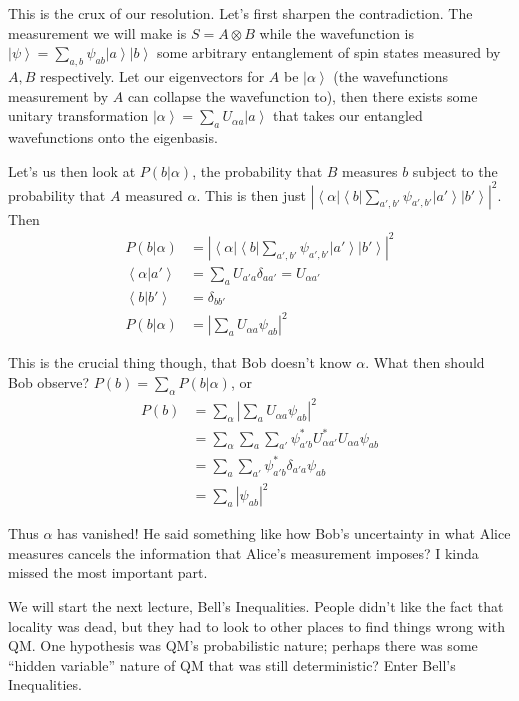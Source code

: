 \documentclass[10pt]{report}
\newcommand{\bra}[1]{\left<#1\right|}
\newcommand{\ket}[1]{\left|#1\right>}
\newcommand{\dotp}[2]{\left<#1\left.\right|#2\right>}
\newcommand{\abs}[1]{\left|#1\right|}
\begin{document}
This is the crux of our resolution. Let's first sharpen the contradiction. The measurement we will make is $S = A \otimes B$ while the wavefunction is $\ket{\psi} = \sum_{a,b}^{}\psi_{ab}\ket{a}\ket{b}$ some arbitrary entanglement of spin states measured by $A,B$ respectively. Let our eigenvectors for $A$ be $\ket{\alpha}$ (the wavefunctions measurement by $A$ can collapse the wavefunction to), then there exists some unitary transformation $\ket{\alpha} = \sum_a^{}U_{\alpha a}\ket{a}$ that takes our entangled wavefunctions onto the eigenbasis.

Let's us then look at $P(b|\alpha)$, the probability that $B$ measures $b$ subject to the probability that $A$ measured $\alpha$. This is then just $\abs{\bra{\alpha}\bra{b}\sum_{a',b'}^{}\psi_{a',b'}\ket{a'}\ket{b'}}^2$. Then
\begin{align}
    P(b|\alpha) &= \abs{\bra{\alpha}\bra{b}\sum_{a',b'}^{}\psi_{a',b'}\ket{a'}\ket{b'}}^2\\
    \dotp{\alpha}{a'} &= \sum_{a}^{}U_{a'a}\delta_{aa'} = U_{\alpha a'}\\
    \dotp{b}{b'} &= \delta_{b b'}\\
    P(b|\alpha) &= \abs{\sum_{a}^{}U_{\alpha a}\psi_{ab}}^2
\end{align}

This is the crucial thing though, that Bob doesn't know $\alpha$. What then should Bob observe? $P(b) = \sum_{\alpha}^{}P(b|\alpha)$, or
\begin{align}
    P(b) &= \sum_{\alpha}^{}\abs{\sum_{a}^{}U_{\alpha a}\psi_{ab}}^2\\
    &= \sum_{\alpha}^{}\sum_{a}^{}\sum_{a'}^{}\psi_{a' b}^*U_{\alpha a'}^*U_{\alpha a}\psi_{ab}\\
    &= \sum_{a}^{}\sum_{a'}^{}\psi_{a' b}^*\delta_{a' a}\psi_{ab}\\
    &= \sum_{a}^{}\abs{\psi_{ab}}^2
\end{align}

Thus $\alpha$ has vanished! He said something like how Bob's uncertainty in what Alice measures cancels the information that Alice's measurement imposes? I kinda missed the most important part.

We will start the next lecture, Bell's Inequalities. People didn't like the fact that locality was dead, but they had to look to other places to find things wrong with QM. One hypothesis was QM's probabilistic nature; perhaps there was some ``hidden variable'' nature of QM that was still deterministic? Enter Bell's Inequalities.
\end{document}
